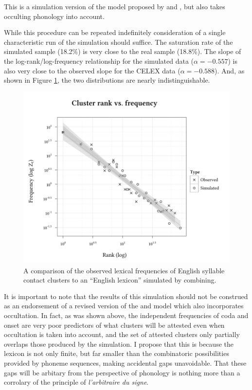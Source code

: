 \noindent
This is a simulation version of the model proposed by \citet{Pierrehumbert1994} and \citet{Coleman1997}, but also takes occulting phonology into account. 

While this procedure can be repeated indefinitely 
consideration of a single characteristic run of the simulation should suffice. The saturation rate of the simulated sample (18.2\%) is very close to the real sample (18.8\%). The slope of the log-rank/log-frequency relationship for the simulated data ($\alpha = -0.557$) is also very close to the observed slope for the CELEX data ($\alpha = -0.588$). And, as shown in Figure \ref{sim}, the two distributions are nearly indistinguishable. 

\begin{figure}
\centering
\includegraphics{sim.pdf}
\caption{A comparison of the observed lexical frequencies of English syllable contact clusters to an ``English lexicon'' simulated by combining.}
\label{sim}
\end{figure}

It is important to note that the results of this simulation should not be construed as an endorsement of a revised version of the \citet{Pierrehumbert1994} and \citet{Coleman1997} model which also incorporates occultation. In fact, as was shown above, the independent frequencies of coda and onset are very poor predictors of what clusters will be attested even when occultation is taken into account, and the set of attested clusters only partially overlaps those produced by the simulation. I propose that this is because the lexicon is not only finite, but far smaller than the combinatoric possibilities provided by phoneme sequences, making accidental gaps unavoidable. That these gaps will be arbitary from the perspective of phonology is nothing more than a corrolary of the principle of \emph{l'arbitraire du signe}. 

